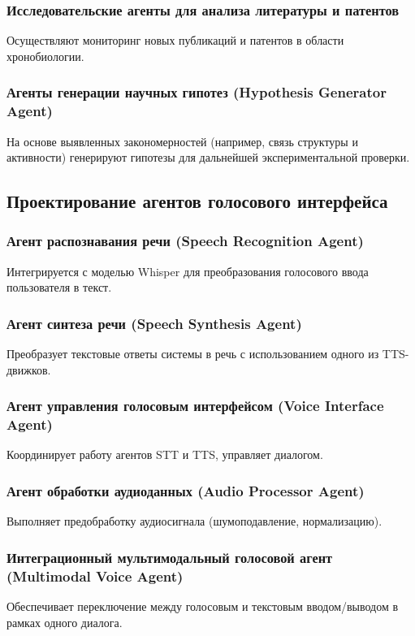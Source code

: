 \documentclass[a4paper,14pt]{extarticle}
\begin{document}
	\subsubsection{Исследовательские агенты для анализа литературы и патентов}
	Осуществляют мониторинг новых публикаций и патентов в области хронобиологии.
	
	\subsubsection{Агенты генерации научных гипотез (Hypothesis Generator Agent)}
	На основе выявленных закономерностей (например, связь структуры и активности) генерируют гипотезы для дальнейшей экспериментальной проверки.
	
	\subsection{Проектирование агентов голосового интерфейса}
	
	\subsubsection{Агент распознавания речи (Speech Recognition Agent)}
	Интегрируется с моделью Whisper для преобразования голосового ввода пользователя в текст.
	
	\subsubsection{Агент синтеза речи (Speech Synthesis Agent)}
	Преобразует текстовые ответы системы в речь с использованием одного из TTS-движков.
	
	\subsubsection{Агент управления голосовым интерфейсом (Voice Interface Agent)}
	Координирует работу агентов STT и TTS, управляет диалогом.
	
	\subsubsection{Агент обработки аудиоданных (Audio Processor Agent)}
	Выполняет предобработку аудиосигнала (шумоподавление, нормализацию).
	
	\subsubsection{Интеграционный мультимодальный голосовой агент (Multimodal Voice Agent)}
	Обеспечивает переключение между голосовым и текстовым вводом/выводом в рамках одного диалога.
	
\end{document}
